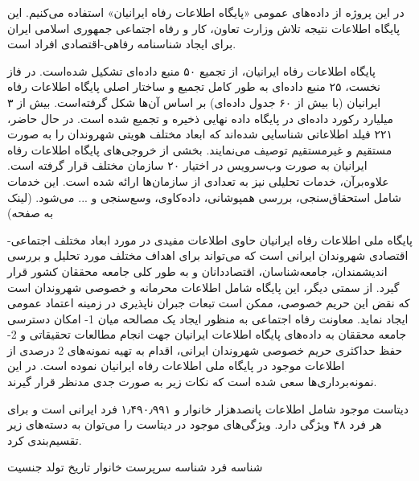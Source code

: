 



در این پروژه از داده‌های عمومی «پایگاه اطلاعات رفاه ایرانیان» استفاده می‌کنیم. این پایگاه اطلاعات نتیجه تلاش وزارت تعاون، کار و رفاه اجتماعی جمهوری اسلامی ایران برای ایجاد شناسنامه رفاهی-اقتصادی افراد است.

پایگاه اطلاعات رفاه ایرانیان، از تجمیع ۵۰ منبع داده‌ای تشکیل شده‌­است. در فاز نخست، ۲۵ منبع داده‌ای به طور کامل تجمیع و ساختار اصلی پایگاه اطلاعات رفاه ایرانیان (با بیش از ۶۰ جدول داده‌ای) بر اساس آن‌ها شکل گرفته‌است. بیش از ۳ میلیارد رکورد داده‌ای در پایگاه ­داده نهایی ذخیره و تجمیع شده‌ است. در حال حاضر، ۲۲۱ فیلد اطلاعاتی شناسایی شده‌اند که ابعاد مختلف هویتی شهروندان را به صورت مستقیم و غیر‌مستقیم توصیف می‌نمایند. بخشی از خروجی‌های پایگاه اطلاعات رفاه ایرانیان به صورت وب‌سرویس در اختیار ۲۰ سازمان مختلف قرار گرفته‌ ­است. علاوه‌بر‌آن، خدمات تحلیلی نیز به تعدادی از سازمان‌ها ارائه شده‌ است. این خدمات شامل استحقاق‌سنجی، بررسی همپوشانی، داده‌کاوی، وسع‌سنجی و ... می‌شود. (لینک به صفحه)

پایگاه ملی اطلاعات رفاه ایرانیان حاوی اطلاعات مفیدی در مورد ابعاد مختلف اجتماعی-اقتصادی  شهروندان ایرانی است که می‌تواند برای اهداف مختلف مورد تحلیل و بررسی اندیشمندان، جامعه‌شناسان، اقتصاددانان و به طور کلی جامعه محققان کشور قرار گیرد. از سمتی دیگر، این پایگاه شامل اطلاعات محرمانه و خصوصی شهروندان است که نقض این حریم خصوصی، ممکن است تبعات جبران ناپذیری در زمینه اعتماد عمومی ایجاد نماید. معاونت رفاه اجتماعی به منظور ایجاد یک مصالحه میان 1- امکان دسترسی جامعه محققان به داده‌های پایگاه اطلاعات ایرانیان جهت انجام مطالعات تحقیقاتی و 2- حفظ حداکثری حریم خصوصی شهروندان ایرانی، اقدام به تهیه نمونه‌های 2 درصدی از اطلاعات موجود در پایگاه ملی اطلاعات رفاه ایرانیان نموده است. در این نمونه‌برداری‌ها سعی شده است که نکات زیر به صورت جدی مدنظر قرار گیرند.



دیتاست موجود شامل اطلاعات پانصدهزار خانوار و ۱٫۴۹۰٫۹۹۱ فرد ایرانی است و برای هر فرد ۴۸ ویژگی دارد. ویژگی‌های موجود در دیتاست را می‌توان به دسته‌های زیر تقسیم‌بندی کرد.

\begin{multicols}{2}
	 شناسه فرد
	 شناسه سرپرست خانوار
	 تاریخ تولد
	 جنسیت
	
\end{multicols}

